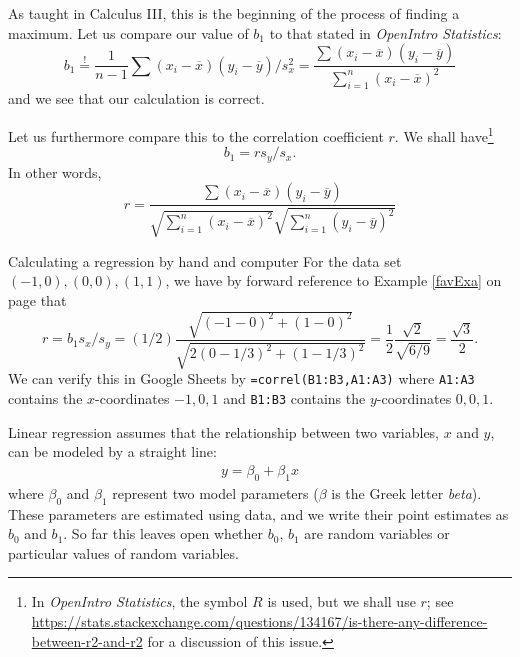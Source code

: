 
As taught in Calculus III, this is the beginning of the process of finding a maximum.
Let us compare our value of $b_1$ to that stated in \emph{OpenIntro Statistics}:
\begin{equation}
	b_1 \overset{!}{=} \frac1{n-1}\sum (x_i-\overline x)(y_i-\overline y)/s_x^2 = \frac{\sum (x_i-\overline x)(y_i-\overline y)}{\sum_{i=1}^n (x_i-\overline x)^2}
\end{equation}
and we see that our calculation is correct.


Let us furthermore compare this to the correlation coefficient $r$. We shall have\footnote{In \emph{OpenIntro Statistics}, the symbol $R$ is used, but we shall use $r$; see \url{https://stats.stackexchange.com/questions/134167/is-there-any-difference-between-r2-and-r2} for a discussion of this issue.}
\[
	b_1=r s_y/s_x.
\]
In other words,
\[
	r = \frac{\sum (x_i-\overline x)(y_i-\overline y)}{\sqrt{\sum_{i=1}^n (x_i-\overline x)^2}\sqrt{\sum_{i=1}^n (y_i-\overline y)^2}}
\]
\begin{example}{Calculating a regression by hand and computer}
For the data set $(-1,0), (0,0), (1,1)$, we have by forward reference to Example \ref{favExa} on page \pageref{favExa} that
\[
	r = b_1 s_x/s_y = (1/2) \frac{\sqrt{(-1-0)^2+(1-0)^2}}{\sqrt{2(0-1/3)^2+(1-1/3)^2}} = \frac12 \frac{\sqrt 2}{\sqrt{6/9}} = \frac{\sqrt{3}}{2}.
\]
We can verify this in Google Sheets by \texttt{=correl(B1:B3,A1:A3)} where \texttt{A1:A3} contains the $x$-coordinates $-1,0,1$ and \texttt{B1:B3} contains the $y$-coordinates $0,0,1$.
\end{example}


Linear regression assumes that the relationship between two variables, $x$ and $y$, can be modeled by a straight line:
\begin{eqnarray}
y = \beta_0 + \beta_1x
\label{genLinModelWNoErrorTerm}
\end{eqnarray}
where $\beta_0$ and $\beta_1$ represent two model parameters ($\beta$ is the Greek letter \emph{beta}). These parameters are estimated using data, and we write their point estimates as $b_0$ and $b_1$. So far this leaves open whether $b_0$, $b_1$ are random variables or particular values of random variables.

